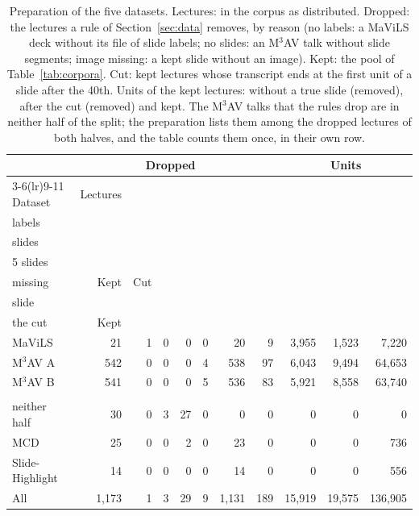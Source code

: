 \begin{table}[t]
\centering
\setlength{\tabcolsep}{3pt}
\caption{Preparation of the five datasets. Lectures: in the corpus as distributed. Dropped: the lectures a rule of Section~\ref{sec:data} removes, by reason (no labels: a MaViLS deck without its file of slide labels; no slides: an M$^3$AV talk without slide segments; image missing: a kept slide without an image). Kept: the pool of Table~\ref{tab:corpora}. Cut: kept lectures whose transcript ends at the first unit of a slide after the 40th. Units of the kept lectures: without a true slide (removed), after the cut (removed) and kept. The M$^3$AV talks that the rules drop are in neither half of the split; the preparation lists them among the dropped lectures of both halves, and the table counts them once, in their own row.}
\label{tab:prepare}
\begin{tabular*}{\linewidth}{@{\extracolsep{\fill}}lrrrrrrrrrr@{}}
\toprule
 &  & \multicolumn{4}{c}{Dropped} &  &  & \multicolumn{3}{c}{Units} \\
\cmidrule(lr){3-6}\cmidrule(lr){9-11}
Dataset & Lectures & \begin{tabular}[b]{@{}r@{}}No\\labels\end{tabular} & \begin{tabular}[b]{@{}r@{}}No\\slides\end{tabular} & \begin{tabular}[b]{@{}r@{}}Under\\5 slides\end{tabular} & \begin{tabular}[b]{@{}r@{}}Image\\missing\end{tabular} & Kept & Cut & \begin{tabular}[b]{@{}r@{}}No true\\slide\end{tabular} & \begin{tabular}[b]{@{}r@{}}After\\the cut\end{tabular} & Kept \\
\midrule
MaViLS & 21 & 1 & 0 & 0 & 0 & 20 & 9 & 3,955 & 1,523 & 7,220 \\
M$^3$AV A & 542 & 0 & 0 & 0 & 4 & 538 & 97 & 6,043 & 9,494 & 64,653 \\
M$^3$AV B & 541 & 0 & 0 & 0 & 5 & 536 & 83 & 5,921 & 8,558 & 63,740 \\
\begin{tabular}[t]{@{}l@{}}M$^3$AV,\\neither half\end{tabular} & 30 & 0 & 3 & 27 & 0 & 0 & 0 & 0 & 0 & 0 \\
MCD & 25 & 0 & 0 & 2 & 0 & 23 & 0 & 0 & 0 & 736 \\
Slide-Highlight & 14 & 0 & 0 & 0 & 0 & 14 & 0 & 0 & 0 & 556 \\
\midrule
All & 1,173 & 1 & 3 & 29 & 9 & 1,131 & 189 & 15,919 & 19,575 & 136,905 \\
\bottomrule
\end{tabular*}
\end{table}
